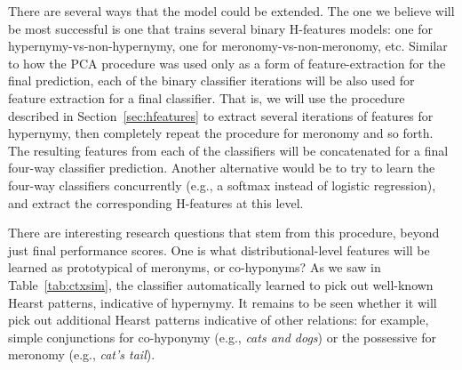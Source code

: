 There are several ways that the model could be extended. The one we believe
will be most successful is one that trains several binary H-features models:
one for hypernymy-vs-non-hypernymy, one for meronomy-vs-non-meronomy, etc.
Similar to how the PCA procedure was used only as a form of feature-extraction
for the final prediction, each of the binary classifier iterations will be also
used for feature extraction for a final classifier.
That is, we will use the procedure described in Section~\ref{sec:hfeatures}
to extract several iterations of features for hypernymy, then completely repeat
the procedure for meronomy and so forth. The resulting features from each
of the classifiers will be concatenated for a final four-way classifier prediction.
Another alternative would be to try to learn the four-way classifiers concurrently
(e.g., a softmax instead of logistic regression), and extract the corresponding
H-features at this level.

There are interesting research questions that stem from this procedure, beyond
just final performance scores. One is what distributional-level features will
be learned as prototypical of meronyms, or co-hyponyms? As we saw in
Table~\ref{tab:ctxsim}, the classifier automatically learned to pick
out well-known Hearst patterns, indicative of hypernymy. It remains to be seen
whether it will pick out additional Hearst patterns indicative of other
relations: for example, simple conjunctions for co-hyponymy (e.g., {\em cats
and dogs}) or the possessive for meronomy (e.g., {\em cat's tail}).


